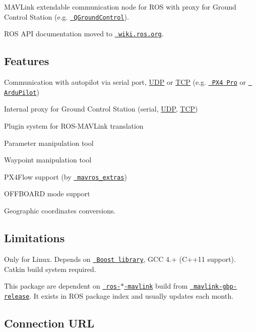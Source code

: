 M\+A\+V\+Link extendable communication node for R\+OS with proxy for Ground Control Station (e.\+g. \href{http://qgroundcontrol.org/}{\texttt{ Q\+Ground\+Control}}).

R\+OS A\+PI documentation moved to \href{http://wiki.ros.org/mavros}{\texttt{ wiki.\+ros.\+org}}.

\subsection*{Features }


\begin{DoxyItemize}
\item Communication with autopilot via serial port, \mbox{\hyperlink{classUDP}{U\+DP}} or \mbox{\hyperlink{classTCP}{T\+CP}} (e.\+g. \href{http://px4.io/}{\texttt{ P\+X4 Pro}} or \href{http://ardupilot.com/}{\texttt{ Ardu\+Pilot}})
\item Internal proxy for Ground Control Station (serial, \mbox{\hyperlink{classUDP}{U\+DP}}, \mbox{\hyperlink{classTCP}{T\+CP}})
\item Plugin system for R\+O\+S-\/\+M\+A\+V\+Link translation
\item Parameter manipulation tool
\item Waypoint manipulation tool
\item P\+X4\+Flow support (by \href{https://github.com/mavlink/mavros/tree/master/mavros_extras}{\texttt{ mavros\+\_\+extras}})
\item O\+F\+F\+B\+O\+A\+RD mode support
\item Geographic coordinates conversions.
\end{DoxyItemize}

\subsection*{Limitations }

Only for Linux. Depends on \href{http://www.boost.org/}{\texttt{ Boost library}}, G\+CC 4.+ (C++11 support). Catkin build system required.

This package are dependent on \href{http://wiki.ros.org/mavlink}{\texttt{ ros-\/$\ast$-\/mavlink}} build from \href{https://github.com/mavlink/mavlink-gbp-release}{\texttt{ mavlink-\/gbp-\/release}}. It exists in R\+OS package index and usually updates each month.

\subsection*{Connection U\+RL }


